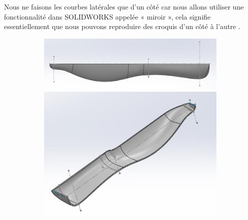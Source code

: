 \FloatBarrier

Nous ne faisons les courbes latérales que d’un côté car nous allons utiliser une fonctionnalité dans SOLIDWORKS appelée « miroir », cela signifie essentiellement que nous pouvons reproduire des croquis d’un côté à l’autre .

\begin{figure}
    \begin{subfigure}[m]{.55\linewidth}
        \centering
        \includegraphics[width=\textwidth]{assets/conception1/img175.jpg}
        \vspace{0.5cm}
        \includegraphics[width=\textwidth]{assets/conception1/img176.jpg}
    \end{subfigure}
    \hfill
    \begin{subfigure}[m]{.4\linewidth}
        \centering

\end{subfigure}
\end{figure}
